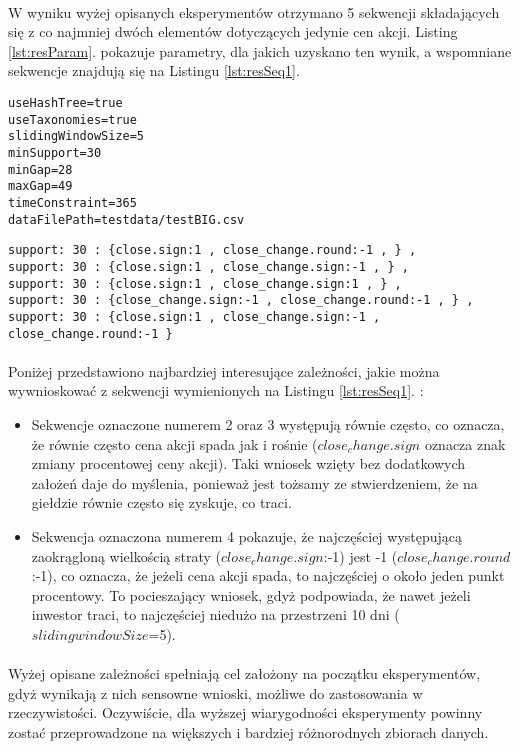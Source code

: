 \documentclass[11pt,a4paper]{article}
\begin{document}
\paragraph{}W wyniku wyżej opisanych eksperymentów otrzymano 5 sekwencji składających się z co najmniej dwóch elementów dotyczących jedynie cen akcji. Listing \ref{lst:resParam}. pokazuje parametry, dla jakich uzyskano ten wynik, a wspomniane sekwencje znajdują się na Listingu \ref{lst:resSeq1}.
\begin{lstlisting}[caption={Parametry ostateczne},label={lst:resParam}]
useHashTree=true
useTaxonomies=true
slidingWindowSize=5
minSupport=30
minGap=28
maxGap=49
timeConstraint=365
dataFilePath=testdata/testBIG.csv
\end{lstlisting}
\newpage
\begin{lstlisting}[caption={Sekwencje wynikowe},label={lst:resSeq1}]
support: 30 : {close.sign:1 , close_change.round:-1 , } ,
support: 30 : {close.sign:1 , close_change.sign:-1 , } ,
support: 30 : {close.sign:1 , close_change.sign:1 , } ,
support: 30 : {close_change.sign:-1 , close_change.round:-1 , } ,
support: 30 : {close.sign:1 , close_change.sign:-1 , close_change.round:-1 }
\end{lstlisting}
\paragraph{}Poniżej przedstawiono najbardziej interesujące zależności, jakie można wywnioskować z sekwencji wymienionych na Listingu \ref{lst:resSeq1}. :
\begin{itemize}
\item Sekwencje oznaczone numerem 2 oraz 3 występują równie często, co oznacza, że równie często cena akcji spada jak i rośnie ($close_change.sign$ oznacza znak zmiany procentowej ceny akcji). Taki wniosek wzięty bez dodatkowych założeń daje do myślenia, ponieważ jest tożsamy ze stwierdzeniem, że na giełdzie równie często się zyskuje, co traci.
\item Sekwencja oznaczona numerem 4 pokazuje, że najczęściej występującą zaokrągloną wielkością straty ($close_change.sign$:-1) jest -1 ($close_change.round$:-1), co oznacza, że jeżeli cena akcji spada, to najczęściej o około jeden punkt procentowy. To pocieszający wniosek, gdyż podpowiada, że nawet jeżeli inwestor traci, to najczęściej niedużo na przestrzeni 10 dni ($slidingwindowSize$=5).
\end{itemize}
\paragraph{}Wyżej opisane zależności spełniają cel założony na początku eksperymentów, gdyż wynikają z nich sensowne wnioski, możliwe do zastosowania w rzeczywistości. Oczywiście, dla wyższej wiarygodności eksperymenty powinny zostać przeprowadzone na większych i bardziej różnorodnych zbiorach danych.
\end{document}
